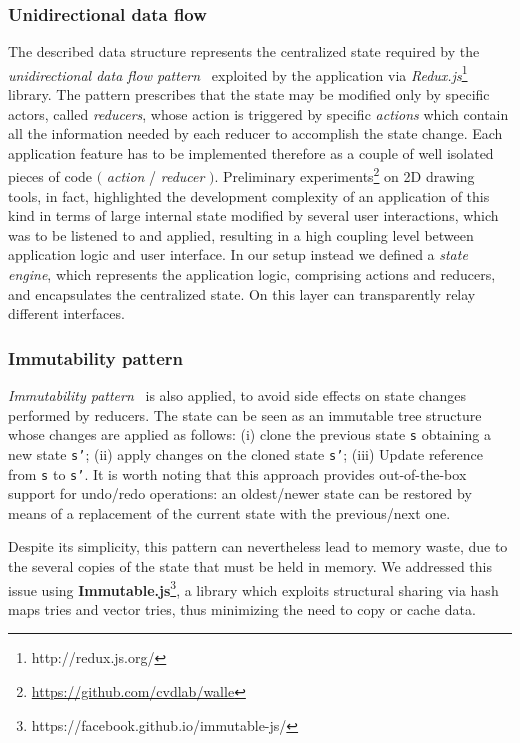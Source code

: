 \subsubsection*{Unidirectional data flow} The described data structure represents the centralized state required by the \emph{unidirectional data flow pattern}~\cite{CITARE QUALCOSA} exploited by the application via \emph{Redux.js}\footnote{http://redux.js.org/} library. The pattern prescribes that the state may be modified only by specific actors, called \emph{reducers}, whose action is triggered by specific \emph{actions} which contain all the information needed by each reducer to accomplish the state change. Each application feature has to be implemented therefore as a couple of well isolated pieces of code $($ \emph{action} / \emph{reducer} $)$. Preliminary experiments\footnote{\url{https://github.com/cvdlab/walle}} on 2D drawing tools, in fact, highlighted the development complexity of an application of this kind in terms of large internal state modified by several user interactions, which was to be listened to and applied, resulting in a high coupling level between application logic and user interface. In our setup instead we defined a \emph{state engine}, which represents the application logic, comprising actions and reducers, and encapsulates the centralized state. On this layer can transparently relay different interfaces.


\subsubsection*{Immutability pattern} \emph{Immutability pattern}~\cite{CITARE QUALCOSA} is also applied, to avoid side effects on state changes performed by reducers. The state can be seen as an immutable tree structure whose changes are applied as follows: (i) clone the previous state \texttt{s} obtaining a new state \texttt{s'}; (ii) apply changes on the cloned state \texttt{s'}; (iii) Update reference from \texttt{s} to \texttt{s'}. It is worth noting that this approach provides out-of-the-box support for undo/redo operations: an oldest/newer state can be restored by means of a replacement of the current state with the previous/next one.

Despite its simplicity, this pattern can nevertheless lead to memory waste, due to the several copies of the state that must be held in memory. We addressed this issue using \textbf{Immutable.js}\footnote{https://facebook.github.io/immutable-js/}, a library which exploits structural sharing via hash maps tries and vector tries, thus minimizing the need to copy or cache data.




